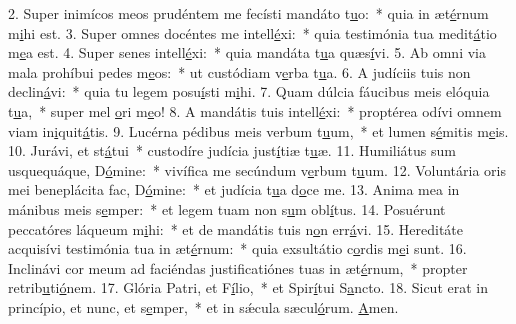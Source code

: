 2. Super inimícos meos prudéntem me fecísti mandáto t\uline{u}o:~* quia in æt\uline{é}rnum m\uline{i}hi est.
3. Super omnes docéntes me intell\uline{é}xi:~* quia testimónia tua medit\uline{á}tio m\uline{e}a est.
4. Super senes intell\uline{é}xi:~* quia mandáta t\uline{u}a quæs\uline{í}vi.
5. Ab omni via mala prohíbui pedes m\uline{e}os:~* ut custódiam v\uline{e}rba t\uline{u}a.
6. A judíciis tuis non declin\uline{á}vi:~* quia tu legem posu\uline{í}sti m\uline{i}hi.
7. Quam dúlcia fáucibus meis elóquia t\uline{u}a,~* super mel \uline{o}ri m\uline{e}o!
8. A mandátis tuis intell\uline{é}xi:~* proptérea odívi omnem viam in\uline{i}quit\uline{á}tis.
9. Lucérna pédibus meis verbum t\uline{u}um,~* et lumen s\uline{é}mitis m\uline{e}is.
10. Jurávi, et st\uline{á}tui~* custodíre judícia just\uline{í}tiæ t\uline{u}æ.
11. Humiliátus sum usquequáque, D\uline{ó}mine:~* vivífica me secúndum v\uline{e}rbum t\uline{u}um.
12. Voluntária oris mei beneplácita fac, D\uline{ó}mine:~* et judícia t\uline{u}a d\uline{o}ce me.
13. Anima mea in mánibus meis s\uline{e}mper:~* et legem tuam non s\uline{u}m obl\uline{í}tus.
14. Posuérunt peccatóres láqueum m\uline{i}hi:~* et de mandátis tuis n\uline{o}n err\uline{á}vi.
15. Hereditáte acquisívi testimónia tua in æt\uline{é}rnum:~* quia exsultátio c\uline{o}rdis m\uline{e}i sunt.
16. Inclinávi cor meum ad faciéndas justificatiónes tuas in æt\uline{é}rnum,~* propter retrib\uline{u}ti\uline{ó}nem.
17. Glória Patri, et F\uline{í}lio,~* et Spir\uline{í}tui S\uline{a}ncto.
18. Sicut erat in princípio, et nunc, et s\uline{e}mper,~* et in sǽcula sæcul\uline{ó}rum. \uline{A}men.
